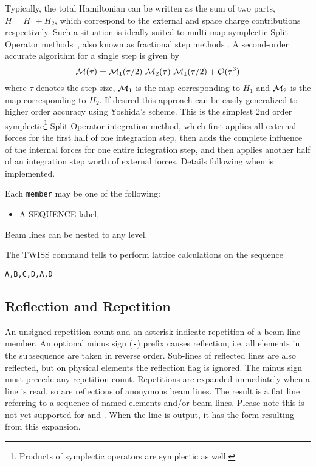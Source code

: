 Typically, the total Hamiltonian can be written as the sum of two parts, $H = H_{1} + H_{2}$,
which correspond to the external and space charge contributions respectively.
Such a situation is ideally suited to multi-map
symplectic Split-Operator methods~\cite{forestall}, also known as fractional step methods \cite{SanzSerna}.
A second-order accurate algorithm for a single step is given by
\begin{equation} \label{eq:splitOper1}
{\cal M}(\tau)={\cal M}_1(\tau/2)~{\cal M}_2(\tau)~{\cal M}_1(\tau/2) + \mathcal{O}(\tau^3)
\end{equation}
where $\tau$ denotes the step size, ${\cal M}_1$ is the map corresponding
to $H_{1}$  and ${\cal M}_2$ is the map corresponding to $H_{2}$.
If desired this approach can be
easily generalized to higher order accuracy using Yoshida's
scheme. %
This is the simplest 2nd order symplectic\footnote{Products of symplectic operators are symplectic as well.} Split-Operator integration method, which first applies all external forces for the first half of one integration step, then adds the complete influence of the internal forces for one entire integration step, and then applies another half of an integration step worth of external forces.
Details following when \opalmap is implemented.




Each \texttt{member} may be one of the following:
\begin{itemize}

\item A {SEQUENCE}  label,
\end{itemize}
Beam lines can be nested to any level.

The {TWISS} command  tells \opal to perform
lattice calculations on the sequence
\begin{verbatim}
A,B,C,D,A,D
\end{verbatim}

\subsection{Reflection and Repetition}
\label{sec:refrep}
An unsigned repetition count and an asterisk indicate
repetition of a beam line member.
An optional minus sign (\texttt{-}) prefix causes reflection,
i.e. all elements in the subsequence are taken in reverse order.
Sub-lines of reflected lines are also reflected,
but on physical elements the reflection flag is ignored.
The minus sign must precede any repetition count.
Repetitions are expanded immediately when a line is read,
so are reflections of anonymous beam lines.
The result is a flat line referring to a sequence of named elements and/or
beam lines.
Please note this is not yet supported for \noopalt and \noopalcycl.
When the line is output, it has the form resulting from this expansion.

